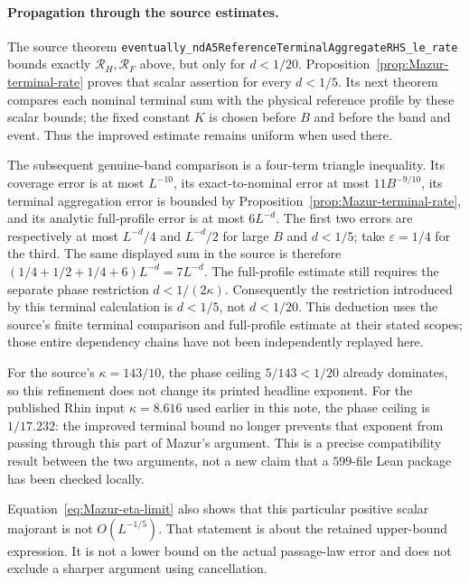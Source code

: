 \paragraph{Propagation through the source estimates.}
The source theorem
\texttt{eventually\_ndA5ReferenceTerminalAggregateRHS\_le\_rate}
bounds exactly $\mathcal R_H,\mathcal R_F$ above, but only for
$d<1/20$. Proposition~\ref{prop:Mazur-terminal-rate} proves
that scalar assertion for every $d<1/5$.
Its next theorem compares each nominal terminal sum with the
physical reference profile by these scalar bounds; the fixed
constant $K$ is chosen before $B$ and before the band and event.
Thus the improved estimate remains uniform when used there.

The subsequent genuine-band comparison is a four-term triangle
inequality. Its coverage error is at most $L^{-10}$,
its exact-to-nominal error at most $11B^{-9/10}$,
its terminal aggregation error is bounded by
Proposition~\ref{prop:Mazur-terminal-rate}, and its analytic
full-profile error is at most $6L^{-d}$.
The first two errors are respectively at most
$L^{-d}/4$ and $L^{-d}/2$ for large $B$ and $d<1/5$;
take $\varepsilon=1/4$ for the third.
The same displayed sum in the source is therefore
$(1/4+1/2+1/4+6)L^{-d}=7L^{-d}$.
The full-profile estimate still requires the separate
phase restriction $d<1/(2\kappa)$.
Consequently the restriction introduced by this terminal
calculation is $d<1/5$, not $d<1/20$.
This deduction uses the source's finite terminal comparison
and full-profile estimate at their stated scopes; those entire
dependency chains have not been independently replayed here.

For the source's $\kappa=143/10$, the phase ceiling
$5/143<1/20$ already dominates, so this refinement does not
change its printed headline exponent. For the published Rhin
input $\kappa=8.616$ used earlier in this note, the phase ceiling
is $1/17.232$: the improved terminal bound no longer prevents
that exponent from passing through this part of Mazur's
argument. This is a precise compatibility result between the
two arguments, not a new claim that a $599$-file Lean package
has been checked locally.

Equation~\eqref{eq:Mazur-eta-limit} also shows that this
particular positive scalar majorant is not $O(L^{-1/5})$.
That statement is about the retained upper-bound expression.
It is not a lower bound on the actual passage-law error and
does not exclude a sharper argument using cancellation.

